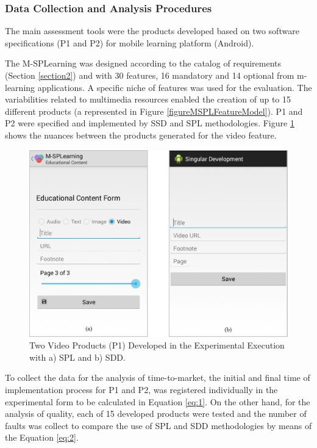\subsubsection{Data Collection and Analysis Procedures}

The main assessment tools were the products developed based on two software specifications (P1 and P2) for mobile learning platform (Android).

The M-SPLear\allowbreak ning was designed according to the catalog of requirements (Section \ref{section2}) and with 30 features, 16 mandatory and 14 optional from m-learning applications. A specific niche of features was used for the evaluation. The variabilities related to multimedia resources enabled the creation of up to 15 different products (a represented in Figure \ref{figureMSPLFeatureModel}). P1 and P2 were specified and implemented by SSD and SPL methodologies. Figure \ref{fig:prod} shows the nuances between the products generated for the video feature.


\begin{figure}
\centering
\includegraphics[scale=0.272]{figures/section4/prod.png}
\centering
\caption{Two Video Products (P1) Developed in the Experimental Execution with a) SPL and b) SDD.}
\label{fig:prod}
\end{figure}


To collect the data for the analysis of time-to-market, the initial and final time of implementation process for P1 and P2, was registered individually in the experimental form to be calculated in Equation \ref{eq:1}. On the other hand, for the analysis of quality, each of 15 developed products were tested and the number of faults was collect to compare the use of SPL and SDD methodologies by means of the Equation \ref{eq:2}.


